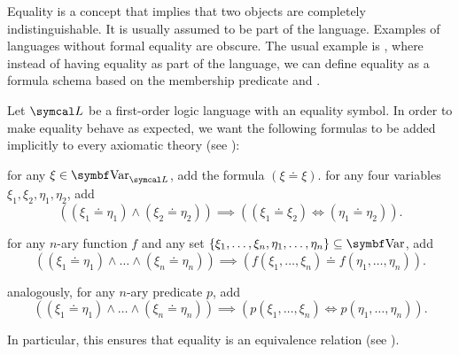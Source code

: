 \begin{remark}\label{remark:first_order_equality}
  Equality is a concept that implies that two objects are completely indistinguishable. It is usually assumed to be part of the language. Examples of languages without formal equality are obscure. The usual example is , where instead of having equality as part of the language, we can define equality as a formula schema based on the membership predicate and .

  Let \( \Cal{L} \) be a first-order logic language with an equality symbol. In order to make equality behave as expected, we want the following formulas to be added implicitly to every axiomatic theory (see ):

  \begin{defenum}
     for any \( \xi \in \Cat{Var}_{\Cal{L}} \), add the formula \( (\xi \doteq \xi) \).
     for any four variables \( \xi_1, \xi_2, \eta_1, \eta_2 \), add
    \begin{equation*}
      ((\xi_1 \doteq \eta_1) \land (\xi_2 \doteq \eta_2)) \implies ((\xi_1 \doteq \xi_2) \iff (\eta_1 \doteq \eta_2)).
    \end{equation*}

     for any \( n \)-ary function \( f \) and any set \( \{ \xi_1, \ldots, \xi_n, \eta_1, \ldots, \eta_n \} \subseteq \Cat{Var} \), add
    \begin{equation*}
      ((\xi_1 \doteq \eta_1) \land \ldots \land (\xi_n \doteq \eta_n)) \implies (f(\xi_1, \ldots, \xi_n) \doteq f(\eta_1, \ldots, \eta_n)).
    \end{equation*}

     analogously, for any \( n \)-ary predicate \( p \), add
    \begin{equation*}
      ((\xi_1 \doteq \eta_1) \land \ldots \land (\xi_n \doteq \eta_n)) \implies (p(\xi_1, \ldots, \xi_n) \iff p(\eta_1, \ldots, \eta_n)).
    \end{equation*}
  \end{defenum}

  In particular, this ensures that equality is an equivalence relation (see ).
\end{remark}

